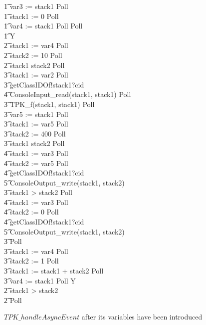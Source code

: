 \begin{figure}[tp!]
\begin{circusaction}
    \t1 var3 := stack1 \circseq Poll \circseq \\
    \t1 stack1 := 0 \circseq Poll \circseq \\
    \t1 var4 := stack1 \circseq Poll \circseq Poll \circseq \\
    \t1 \circmu Y \circspot \\
    \t2 stack1 := var4 \circseq Poll \circseq \\
    \t2 stack2 := 10 \circseq Poll \circseq \\
    \t2 \circif stack1 \leq stack2 \circthen Poll \circseq \\
    \t3 stack1 := var2 \circseq Poll \circseq \\
    \t3 getClassIDOf!stack1?cid \\
    \t4 {} \then ConsoleInput\_read(stack1, stack1) \circseq Poll \circseq \\
    \t3 TPK\_f(stack1, stack1) \circseq Poll \circseq \\
    \t3 var5 := stack1 \circseq Poll \circseq \\
    \t3 stack1 := var5 \circseq Poll \circseq \\
    \t3 stack2 := 400 \circseq Poll \circseq \\
    \t3 \circif stack1 \leq stack2 \circthen Poll \circseq \\
    \t4 stack1 := var3 \circseq Poll \circseq \\
    \t4 stack2 := var5 \circseq Poll \circseq \\
    \t4 getClassIDOf!stack1?cid \\
    \t5 {} \then ConsoleOutput\_write(stack1, stack2) \\
    \t3 {} \circelse stack1 > stack2 \circthen Poll \circseq \\
    \t4 stack1 := var3 \circseq Poll \circseq \\
    \t4 stack2 := 0 \circseq Poll \circseq \\
    \t4 getClassIDOf!stack1?cid \\
    \t5 {} \then ConsoleOutput\_write(stack1, stack2) \\
    \t3 \circfi \circseq Poll \circseq \\
    \t3 stack1 := var4 \circseq Poll \circseq \\
    \t3 stack2 := 1 \circseq Poll \circseq \\
    \t3 stack1 := stack1 + stack2 \circseq Poll \circseq \\
    \t3 var4 := stack1 \circseq Poll \circseq Y \\
    \t2 {} \circelse stack1 > stack2 \circthen \Skip \\
    \t2 \circfi \circseq Poll
  \end{circusaction}
  \caption{$TPK\_handleAsyncEvent$ after its variables have been introduced}
  \label{efs-introduce-variables-example-figure}
\end{figure}